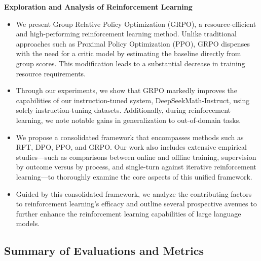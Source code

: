 \textbf{Exploration and Analysis of Reinforcement Learning}

\begin{itemize}[topsep=0pt]
    \item We present Group Relative Policy Optimization (GRPO), a resource-efficient and high-performing reinforcement learning method. Unlike traditional approaches such as Proximal Policy Optimization (PPO), GRPO dispenses with the need for a critic model by estimating the baseline directly from group scores. This modification leads to a substantial decrease in training resource requirements.
    \item Through our experiments, we show that GRPO markedly improves the capabilities of our instruction-tuned system, DeepSeekMath-Instruct, using solely instruction-tuning datasets. Additionally, during reinforcement learning, we note notable gains in generalization to out-of-domain tasks.
    \item We propose a consolidated framework that encompasses methods such as RFT, DPO, PPO, and GRPO. Our work also includes extensive empirical studies—such as comparisons between online and offline training, supervision by outcome versus by process, and single-turn against iterative reinforcement learning—to thoroughly examine the core aspects of this unified framework.
    \item Guided by this consolidated framework, we analyze the contributing factors to reinforcement learning's efficacy and outline several prospective avenues to further enhance the reinforcement learning capabilities of large language models.
\end{itemize}

\subsection{Summary of Evaluations and Metrics}

